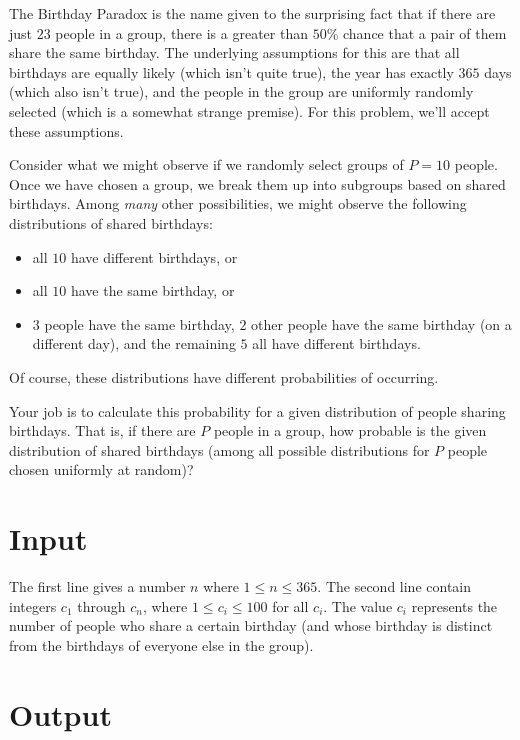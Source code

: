 

The Birthday Paradox is the name given to the surprising fact that if there are
just $23$ people in a group, there is a greater than $50\%$ chance that a pair
of them share the same birthday. The underlying assumptions for this are that
all birthdays are equally likely (which isn't quite true), the year has exactly
$365$ days (which also isn't true), and the people in the group are uniformly
randomly selected (which is a somewhat strange premise).  For this problem,
we'll accept these assumptions.

Consider what we might observe if we randomly select groups of $P=10$ people.
Once we have chosen a group, we break them up into subgroups based on shared birthdays.
Among \textit{many} other possibilities, we might observe the following
distributions of shared birthdays:
\begin{itemize}
    \item all $10$ have different birthdays, or
    \item all $10$ have the same birthday, or
    \item $3$ people have the same birthday, $2$ other people
        have the same birthday (on a different day), and the remaining $5$ all
        have different birthdays.
\end{itemize}
Of course, these distributions have different probabilities of occurring.

Your job is to calculate this probability for a given distribution of people
sharing birthdays.  That is, if there are $P$ people in a group, how probable
is the given distribution of shared birthdays (among all possible distributions
for $P$ people chosen uniformly at random)?

\section*{Input}

The first line gives a number $n$ where $1 \le n \le 365$.
The second line contain integers $c_1$ through $c_n$, where
$1 \le c_i \le 100$ for all $c_i$. The value $c_i$ represents the number of
people who share a certain birthday (and whose birthday is distinct from the
birthdays of everyone else in the group).

\section*{Output}

